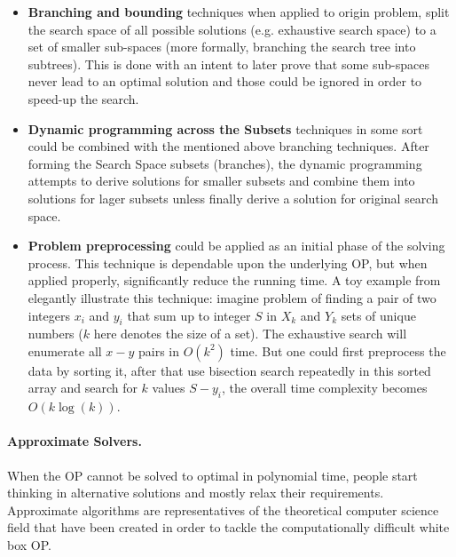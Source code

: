 \begin{itemize}
	\item \textbf{Branching and bounding} techniques when applied to origin problem, split the search space of all possible solutions (e.g. exhaustive search space) to a set of smaller sub-spaces (more formally, branching the search tree into subtrees). This is done with an intent to later prove that some sub-spaces never lead to an optimal solution and those could be ignored in order to speed-up the search.
	
	\item \textbf{Dynamic programming across the Subsets} techniques in some sort could be combined with the mentioned above branching techniques. After forming the Search Space subsets (branches), the dynamic programming attempts to derive solutions for smaller subsets and combine them into solutions for lager subsets unless finally derive a solution for original search space.
	
	\item \textbf{Problem preprocessing} could be applied as an initial phase of the solving process. This technique is dependable upon the underlying OP, but when applied properly, significantly reduce the running time. A toy example from \cite{woeginger2003exact} elegantly illustrate this technique: imagine problem of finding a pair of two integers $x_i$ and $y_i$ that sum up to integer $S$ in $X_k$ and $Y_k$ sets of unique numbers ($k$ here denotes the size of a set). The exhaustive search will enumerate all $x-y$ pairs in $O(k^2)$ time. But one could first preprocess the data by sorting it, after that use bisection search repeatedly in this sorted array and search for $k$ values $S - y_i$, the overall time complexity becomes $O(k\log(k))$.
\end{itemize}


\paragraph{Approximate Solvers.} When the OP cannot be solved to optimal in polynomial time, people start thinking in alternative solutions and mostly relax their requirements. Approximate algorithms are representatives of the theoretical computer science field that have been created in order to tackle the computationally difficult white box OP. %


